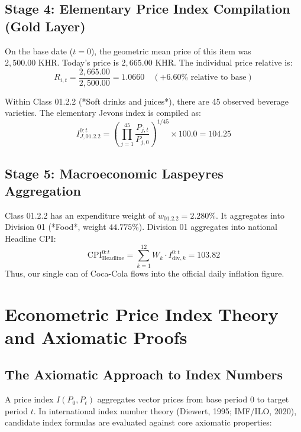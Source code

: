 \documentclass[11pt,a4paper,oneside]{article}
\begin{document}
\subsection{Stage 4: Elementary Price Index Compilation (Gold Layer)}
On the base date ($t=0$), the geometric mean price of this item was $2,500.00\text{ KHR}$. Today's price is $2,665.00\text{ KHR}$. The individual price relative is:
\begin{equation}
R_{i, t} = \frac{2,665.00}{2,500.00} = 1.0660 \quad (+6.60\% \text{ relative to base})
\end{equation}

Within Class 01.2.2 (*Soft drinks and juices*), there are 45 observed beverage varieties. The elementary Jevons index is compiled as:
\begin{equation}
I_{J, 01.2.2}^{0:t} = \left( \prod_{j=1}^{45} \frac{P_{j, t}}{P_{j, 0}} \right)^{1/45} \times 100.0 = 104.25
\end{equation}

\subsection{Stage 5: Macroeconomic Laspeyres Aggregation}
Class 01.2.2 has an expenditure weight of $w_{01.2.2} = 2.280\%$. It aggregates into Division 01 (*Food*, weight $44.775\%$). Division 01 aggregates into national Headline CPI:
\begin{equation}
\text{CPI}_{\text{Headline}}^{0:t} = \sum_{k=1}^{12} W_k \cdot I_{\text{div}, k}^{0:t} = 103.82
\end{equation}
Thus, our single can of Coca-Cola flows into the official daily inflation figure.

\newpage

\section{Econometric Price Index Theory and Axiomatic Proofs}

\subsection{The Axiomatic Approach to Index Numbers}
A price index $I(P_0, P_t)$ aggregates vector prices from base period $0$ to target period $t$. In international index number theory (Diewert, 1995; IMF/ILO, 2020), candidate index formulas are evaluated against core axiomatic properties:
\end{document}
